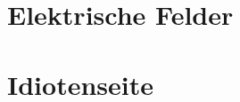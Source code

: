 \newcommand{\titleinfo}{Elektrizit\"atslehre 3 - Formelsammlung}
\newcommand{\authorinfo}{Braun\&Co., J\"urg, DIE Schwachstromelektriker, K\"orner,
						Gwerder}
\newcommand{\versioninfo}{$ Revision: 0.1 $ - $\omega = 2 \cdot \pi f$ | 
							gem\"ass Unterricht Josef Ebneter/HS2012 }
 
%


\usepackage{circuitikz}

\section{Elektrische Felder}


\newpage

%
\newpage
\section{Idiotenseite}



%




